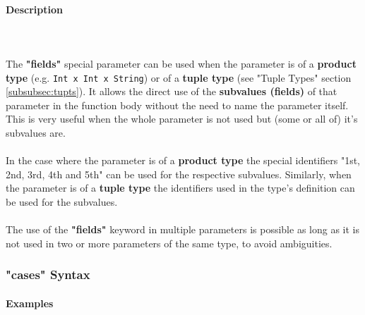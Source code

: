 \documentclass{article}
\def\pend{\mbox{} \\\\}
\begin{document}
\paragraph{Description}\pend
The \textbf{"fields"} special parameter can be used when the parameter is of a
\textbf{product type} (e.g. \texttt{Int x Int x String}) or of a \textbf{tuple
type} (see "Tuple Types" section \ref{subsubsec:tupts}).  It allows the direct
use of the \textbf{subvalues (fields)} of that parameter in the function body
without the need to name the parameter itself. This is very useful when the
whole parameter is not used but (some or all of) it's subvalues are.
\\\\
In the case where the parameter is of a \textbf{product type} the special identifiers
"1st, 2nd, 3rd, 4th and 5th" can be used for the respective subvalues.
Similarly, when the parameter is of a \textbf{tuple type} the identifiers used in
the type's definition can be used for the subvalues. 
\\\\
The use of the \textbf{"fields"} keyword in multiple parameters is possible as
long as it is not used in two or more parameters of the same type, to avoid 
ambiguities.

\subsubsection{"cases" Syntax} \label{subsubsec:casessyntax}

\paragraph{Examples}
\end{document}
